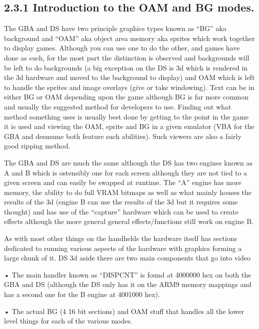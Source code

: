 \documentclass[
]{book}
\begin{document}
\hypertarget{introduction-to-the-oam-and-bg-modes.}{%
\subsection{2.3.1 Introduction to the OAM and BG modes.}\label{introduction-to-the-oam-and-bg-modes.}}

The GBA and DS have two principle graphics types known as ``BG'' aka background and ``OAM'' aka object area memory aka sprites which work together to display games. Although you can use one to do the other, and games have done as such, for the most part the distinction is observed and backgrounds will be left to do backgrounds (a big exception on the DS is 3d which is rendered in the 3d hardware and moved to the background to display) and OAM which is left to handle the sprites and image overlays (give or take windowing). Text can be in either BG or OAM depending upon the game although BG is far more common and usually the suggested method for developers to use. Finding out what method something uses is usually best done by getting to the point in the game it is used and viewing the OAM, sprite and BG in a given emulator (VBA for the GBA and desmume both feature such abilities). Such viewers are also a fairly good ripping method.

The GBA and DS are much the same although the DS has two engines known as A and B which is ostensibly one for each screen although they are not tied to a given screen and can easily be swapped at runtime. The ``A'' engine has more memory, the ability to do full VRAM bitmaps as well as what mainly houses the results of the 3d (engine B can use the results of the 3d but it requires some thought) and has use of the ``capture'' hardware which can be used to create effects although the more general general effects/functions still work on engine B.

As with most other things on the handhelds the hardware itself has sections dedicated to running various aspects of the hardware with graphics forming a large chunk of it. DS 3d aside there are two main components that go into video

• The main handler known as ``DISPCNT'' is found at 4000000 hex on both the GBA and DS (although the DS only has it on the ARM9 memory mappings and has a second one for the B engine at 4001000 hex).

• The actual BG (4 16 bit sections) and OAM stuff that handles all the lower level things for each of the various modes.
\end{document}
